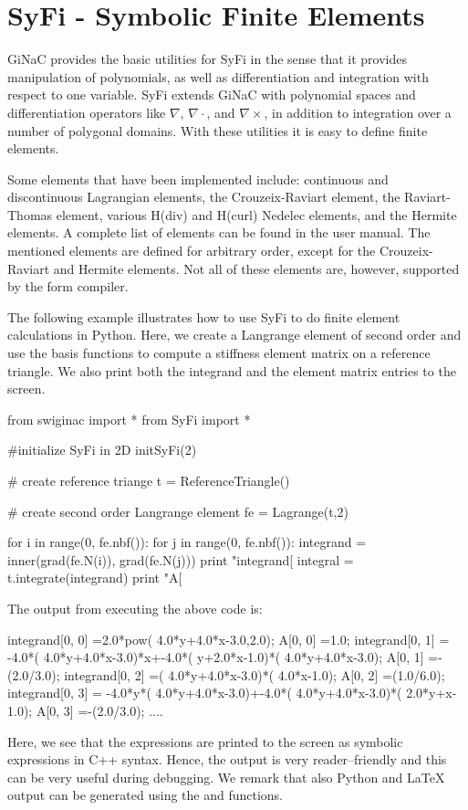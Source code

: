 \section{SyFi - Symbolic Finite Elements}

GiNaC provides the basic utilities for SyFi in the sense
that it provides manipulation of polynomials, as well as differentiation and integration  
with respect to one variable. SyFi extends GiNaC with polynomial spaces and 
differentiation operators like $\nabla$, $\nabla\cdot$, and $\nabla\times$, 
in addition to integration over a number of polygonal domains. 
With these utilities it is easy to define finite elements. 

Some elements that have been implemented include:
continuous and discontinuous Lagrangian elements, 
the Crouzeix-Raviart element, the Raviart-Thomas element, various H(div) and H(curl) Nedelec 
elements, and the Hermite elements. A complete list of elements can be found
in the user manual. The mentioned elements are defined for arbitrary order, except for
the Crouzeix-Raviart and Hermite elements. Not all of these elements are, however, 
supported by the form compiler. 

The following example illustrates how to use SyFi to do finite element calculations in Python. 
Here, we create a Langrange element of second order and use the basis functions to compute a 
stiffness element matrix on a reference triangle. We also print both the integrand and 
the element matrix entries to the screen. 
\begin{python}
from swiginac import *
from SyFi import * 

#initialize SyFi in 2D
initSyFi(2)

# create reference triange 
t = ReferenceTriangle() 

# create second order Langrange element
fe = Lagrange(t,2)

for i in range(0, fe.nbf()):
    for j in range(0, fe.nbf()):
	integrand = inner(grad(fe.N(i)), grad(fe.N(j)))
	print "integrand[%
	integral = t.integrate(integrand) 
	print "A[%
\end{python}
The output from executing the above code is: 
\begin{c++}
integrand[0, 0]  =2.0*pow( 4.0*y+4.0*x-3.0,2.0);
A[0, 0]          =1.0;
integrand[0, 1]  = -4.0*( 4.0*y+4.0*x-3.0)*x+-4.0*( y+2.0*x-1.0)*( 4.0*y+4.0*x-3.0);
A[0, 1]          =-(2.0/3.0);
integrand[0, 2]  =( 4.0*y+4.0*x-3.0)*( 4.0*x-1.0);
A[0, 2]          =(1.0/6.0);
integrand[0, 3]  = -4.0*y*( 4.0*y+4.0*x-3.0)+-4.0*( 4.0*y+4.0*x-3.0)*( 2.0*y+x-1.0);
A[0, 3]          =-(2.0/3.0);
....
\end{c++}
Here, we see that the expressions are printed to the screen as symbolic expressions
in C++ syntax. Hence, the output is very reader--friendly and this can be very useful during debugging.  
We remark that also Python and LaTeX output can be generated using the  and  functions. 


